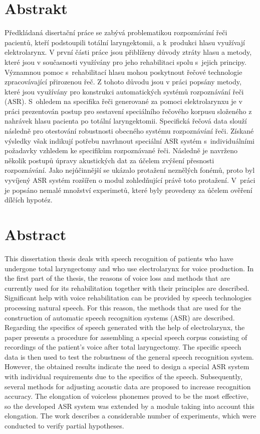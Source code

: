 \section*{Abstrakt}

Předkládaná disertační práce se zabývá problematikou rozpoznávání řeči pacientů, kteří podstoupili totální laryngektomii, a  k~produkci hlasu využívají elektrolarynx. V první části práce jsou přiblíženy důvody ztráty hlasu a metody, které jsou v současnosti využívány pro jeho rehabilitaci spolu s~jejich principy. Významnou pomoc s~rehabilitací hlasu mohou poskytnout řečové technologie zpracovávající přirozenou řeč. Z tohoto důvodu jsou v práci popsány metody, které jsou využívány pro  konstrukci automatických systémů rozpoznávání řeči (ASR). S~ohledem na specifika řeči generované za pomoci elektrolarynxu je v práci prezentován postup pro sestavení speciálního řečového korpusu složeného z nahrávek hlasu pacienta po totální laryngektomii. Specifická řečová data slouží následně pro otestování robustnosti obecného systému rozpoznávání řeči. Získané výsledky však indikují potřebu navrhnout speciální ASR systém s~individuálními požadavky vzhledem ke specifikům rozpoznávané řeči. Následně je navrženo několik postupů úpravy akustických dat za účelem zvýšení přesnosti rozpoznávání. Jako nejúčinnější se ukázalo protažení neznělých fonémů, proto byl vyvíjený ASR systém rozšířen o modul zohledňující právě toto protažení. V~práci je popsáno nemalé množství experimetů, které byly provedeny za účelem ověření dílčích hypotéz.

\clearpage

\section*{Abstract}

This dissertation thesis deals with speech recognition of patients who have undergone total laryngectomy and who use electrolarynx for voice production. In the first part of the thesis, the reasons of voice loss and methods that are currently used for its rehabilitation together with their principles are described. Significant help with voice rehabilitation can be provided by speech technologies processing natural speech. For this reason, the methods that are used for the construction of automatic speech recognition systems (ASR) are described. Regarding the specifics of speech generated with the help of electrolarynx, the paper presents a procedure for assembling a special speech corpus consisting of recordings of the patient's voice after total laryngectomy. The specific speech data is then used to test the robustness of the general speech recognition system. However, the obtained results indicate the need to design a special ASR system with individual requirements due to the specifics of the speech. Subsequently, several methods for adjusting acoustic data are proposed to increase recognition accuracy. The elongation of voiceless phonemes proved to be the most effective, so the developed ASR system was extended by a module taking into account this elongation. The work describes a considerable number of experiments, which were conducted to verify partial hypotheses.

